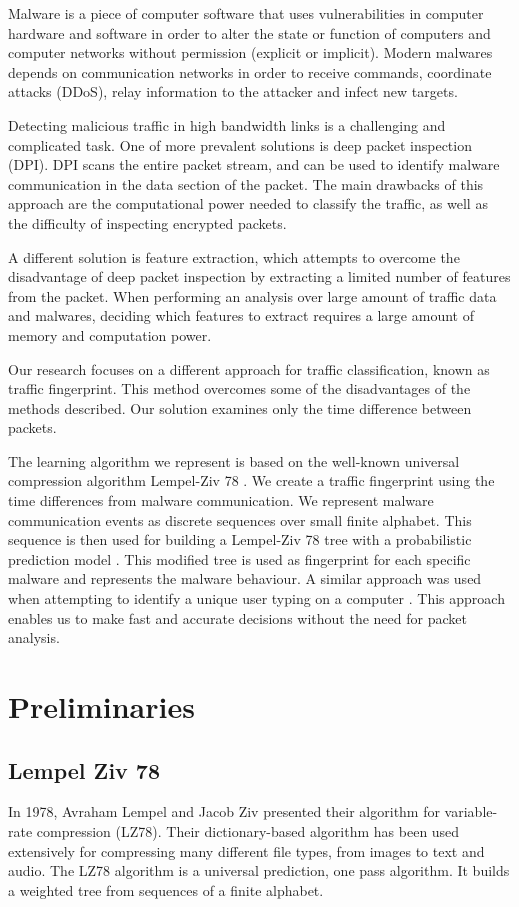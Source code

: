 \documentclass[9pt,journal,compsoc]{IEEEtran}
\begin{document}
Malware is a piece of computer software that uses vulnerabilities in computer hardware and software in order to alter the state or function of computers and computer networks without permission (explicit or implicit). Modern malwares depends on communication networks in order to receive commands, coordinate attacks (DDoS), relay information to the attacker and infect new targets.

Detecting malicious traffic in high bandwidth links is a challenging and complicated task. One of more prevalent solutions is deep packet inspection (DPI). DPI scans the entire packet stream, and can be used to identify malware communication in the data section of the packet. The main drawbacks of this approach are the computational power needed to classify the traffic, as well as the difficulty of inspecting encrypted packets. 

A different solution is feature extraction, which attempts to overcome the disadvantage of deep packet inspection by extracting a limited number of features from the packet. When performing an analysis over large amount of traffic data and malwares, deciding which features to extract requires a large amount of memory and computation power.

Our research focuses on a different approach for traffic classification, known as traffic fingerprint. This method overcomes some of the disadvantages of the methods described. Our solution examines only the time difference between packets.

The learning algorithm we represent is based on the well-known universal compression algorithm Lempel-Ziv 78 \cite{Lem78}. We create a traffic fingerprint using the time differences from malware communication. We represent malware communication events as discrete sequences over small finite alphabet. This sequence is then used for building a Lempel-Ziv 78 tree with a probabilistic prediction model \cite{MFe92}. This modified tree is used as fingerprint for each specific malware and represents the malware behaviour. A similar approach was used when attempting to identify a unique user typing on a computer \cite{Nis03}.
This approach enables us to make fast and accurate decisions without the need for packet analysis.

\section{Preliminaries}
\subsection{Lempel Ziv 78}
In 1978, Avraham Lempel and Jacob Ziv presented their algorithm for variable-rate compression \cite{Lem78} (LZ78). Their dictionary-based algorithm has been used extensively for compressing many different file types, from images to text and audio.
The LZ78 algorithm is a universal prediction, one pass algorithm. It builds a weighted tree from sequences of a finite alphabet.
\end{document}

